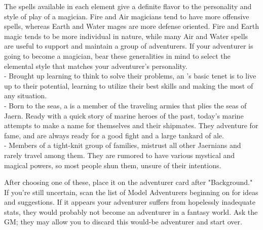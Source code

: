 \begin{multicols*}{2}
The spells available in each element give a definite flavor to the personality and style of play of a magician. Fire and Air magicians tend to have more offensive spells, whereas Earth and Water mages are more defense oriented. Fire and Earth magic tends to be more individual in nature, while many Air and Water spells are useful to support and maintain a group of adventurers. If your adventurer is going to become a magician, bear these generalities in mind to select the elemental style that matches your adventurer's personality.\\
- Brought up learning to think to solve their problems, an 's basic tenet is to live up to their potential, learning to utilize their best skills and making the most of any situation.\\
- Born to the seas, a  is a member of the traveling armies that plies the seas of Jaern. Ready with a quick story of marine heroes of the past, today's marine attempts to make a name for themselves and their shipmates. They adventure for fame, and are always ready for a good fight and a large tankard of ale.\\
- Members of a tight-knit group of families,  mistrust all other Jaernians and rarely travel among them. They are rumored to have various mystical and magical powers, so most people shun them, unsure of their intentions.

After choosing one of these, place it on the adventurer card after "Background." If you're still uncertain, scan the list of Model Adventurers beginning on \tcpage{\pageref{create-models}} for ideas and suggestions. If it appears your adventurer suffers from hopelessly inadequate stats, they would probably not become an adventurer in a fantasy world. Ask the GM; they may allow you to discard this would-be adventurer and start over.

\end{multicols*}

